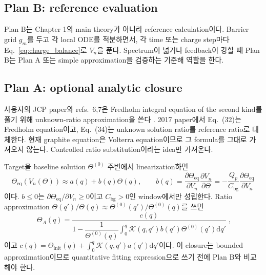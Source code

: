 \documentclass[11pt,a4paper]{article}
\newcommand{\dd}{\mathrm{d}}
\newcommand{\eq}{\mathrm{eq}}
\newcommand{\bg}{\mathrm{bg}}
\begin{document}
\subsection{Plan B: reference evaluation}\label{sec:planB}
Plan B는 Chapter 1의 main theory가 아니라 reference calculation이다. Barrier grid $g_m$를 두고 각 local ODE를 적분하면서,
각 time 또는 charge step마다 Eq.~\eqref{eq:charge_balance}로 $V_n$을 푼다. Spectrum이 넓거나 feedback이 강할 때 Plan B는
Plan A 또는 simple approximation을 검증하는 기준해 역할을 한다.

\subsection{Plan A: optional analytic closure}\label{sec:planA}
사용자의 JCP paper와 refs.~6,7은 Fredholm integral equation of the second kind를 풀기 위해 unknown-ratio approximation을 쓴다
\cite{lee2011,son2013,jcp2017}. 2017 paper에서 Eq.~(32)는 Fredholm equation이고, Eq.~(34)는 unknown solution ratio를 reference
ratio로 대체한다. 현재 graphite equation은 Volterra equation이므로 그 formula를 그대로 가져오지 않는다. Controlled ratio
substitution이라는 idea만 가져온다.

Target을 baseline solution $\Theta^{(0)}$ 주변에서 linearization하면
\begin{equation}
\Theta_{\eq}(V_n(\Theta))\approx a(q)+b(q)\Theta(q),
\qquad
b(q)=\frac{\partial\Theta_{\eq}}{\partial V_n}\frac{\partial V_n}{\partial\Theta}
=-\frac{Q_p}{C_{\bg}}\frac{\partial\Theta_{\eq}}{\partial V_n}
\label{eq:selfcoupling}
\end{equation}
이다. $b\le0$는 $\partial\Theta_{\eq}/\partial V_n\ge0$이고 $C_{\bg}>0$인 window에서만 성립한다. Ratio approximation
$\Theta(q')/\Theta(q)\approx\Theta^{(0)}(q')/\Theta^{(0)}(q)$를 쓰면
\begin{equation}
\boxed{\;\Theta_A(q)=\frac{c(q)}{1-\dfrac{1}{\Theta^{(0)}(q)}
\displaystyle\int_0^q\mathcal K(q,q')b(q')\Theta^{(0)}(q')\dd q'}\;,}
\label{eq:closed}
\end{equation}
이고 $c(q)=\Theta_{\mathrm{init}}(q)+\int_0^q\mathcal K(q,q')a(q')\dd q'$이다. 이 closure는 bounded approximation이므로
quantitative fitting expression으로 쓰기 전에 Plan B와 비교해야 한다.
\end{document}
